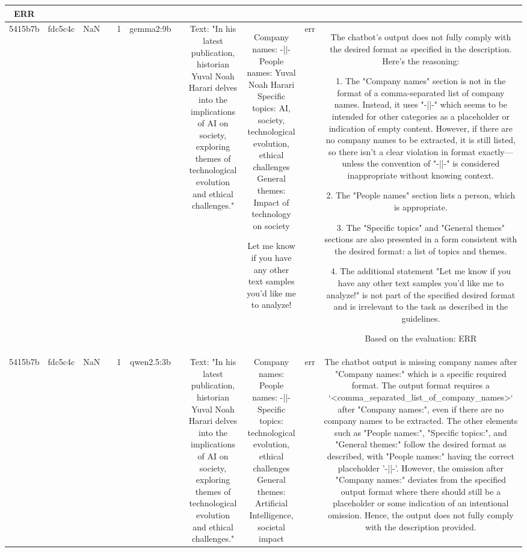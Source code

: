 \begin{table}[h!]
\begin{tabular}{|c|c|c|c|c|c|c|c|c|c|c|}
ERR\\
\hline
5415b7b & fdc5c4c & NaN &  & 1 & gemma2:9b &  & Text: "In his latest publication, historian Yuval Noah Harari delves into the implications of AI on society, exploring themes of technological evolution and ethical challenges." & Company names: -||-
People names: Yuval Noah Harari
Specific topics: AI, society, technological evolution, ethical challenges
General themes: Impact of technology on society  




Let me know if you have any other text samples you'd like me to analyze! 
 & err & The chatbot's output does not fully comply with the desired format as specified in the description. Here's the reasoning:

1. The "Company names" section is not in the format of a comma-separated list of company names. Instead, it uses "-||-" which seems to be intended for other categories as a placeholder or indication of empty content. However, if there are no company names to be extracted, it is still listed, so there isn't a clear violation in format exactly—unless the convention of "-||-" is considered inappropriate without knowing context.

2. The "People names" section lists a person, which is appropriate.

3. The "Specific topics" and "General themes" sections are also presented in a form consistent with the desired format: a list of topics and themes.

4. The additional statement "Let me know if you have any other text samples you'd like me to analyze!" is not part of the specified desired format and is irrelevant to the task as described in the guidelines.

Based on the evaluation:
ERR\\
\hline
5415b7b & fdc5c4c & NaN &  & 1 & qwen2.5:3b &  & Text: "In his latest publication, historian Yuval Noah Harari delves into the implications of AI on society, exploring themes of technological evolution and ethical challenges." & Company names: 
People names: -||-
Specific topics: technological evolution, ethical challenges
General themes: Artificial Intelligence, societal impact & err & The chatbot output is missing company names after "Company names:" which is a specific required format. The output format requires a `<comma_separated_list_of_company_names>` after "Company names:", even if there are no company names to be extracted. The other elements such as "People names:", "Specific topics:", and "General themes:" follow the desired format as described, with "People names:" having the correct placeholder '-||-'. However, the omission after "Company names:" deviates from the specified output format where there should still be a placeholder or some indication of an intentional omission. Hence, the output does not fully comply with the description provided.


\end{tabular}
\end{table}
